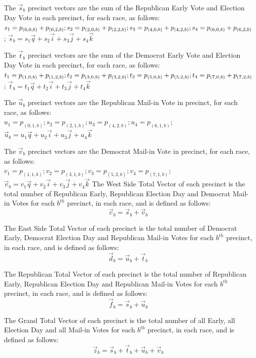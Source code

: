 The $\vec{s}_b$ precinct vectors are the sum of the Republican Early Vote and Election Day Vote in each precinct, for each race, as follows:\\
$s_{1}=p_{(0,0,b)}+p_{(0,2,b)}; s_{2}=p_{(2,0,b)}+p_{(2,2,b)};\\
s_{3}=p_{(4,0,b)}+p_{(4,2,b)}; s_{4}=p_{(6,0,b)}+p_{(6,2,b)}$; $\vec{s}_{b}=s_{1}\vec{q}+s_{2}\vec{i}+s_{3}\vec{j}+s_{4}\vec{k}$

The $\vec{t}_b$ precinct vectors are the sum of the Democrat Early Vote and Election Day Vote in each precinct, for each race, as follows:\\
$t_{1}=p_{(1,0,b)}+p_{(1,2,b)}; t_{2}=p_{(3,0,b)}+p_{(3,2,b)};\\
t_{3}=p_{(5,0,b)}+p_{(5,2,b)}; t_{4}=p_{(7,0,b)}+p_{(7,2,b)}$; $\vec{t}_{b}=t_{1}\vec{q}+t_{2}\vec{i}+t_{3}\vec{j}+t_{4}\vec{k}$

The $\vec{u}_b$ precinct vectors are the Republican Mail-in Vote in precinct, for each race, as follows:\\
$u_{1}=p_{(0,1,b)}; s_{2}=p_{(2,1,b)}; u_{3}=p_{(4,2,b)}; u_{4}=p_{(6,1,b)}$; $\vec{u}_{b}=u_{1}\vec{q}+u_{2}\vec{i}+u_{3}\vec{j}+u_{4}\vec{k}$

The $\vec{v}_b$ precinct vectors are the Democrat Mail-in Vote in precinct, for each race, as follows:\\
$v_{1}=p_{(1,1,b)}; v_{2}=p_{(3,1,b)}; v_{3}=p_{(5,2,b)}; v_{4}=p_{(7,1,b)}$; $\vec{v}_{b}=v_{1}\vec{q}+v_{2}\vec{i}+v_{3}\vec{j}+v_{4}\vec{k}$
\newpage
The West Side Total Vector of each precinct is the total number of Republican Early, Republican Election Day and Democrat Mail-in Votes for each $b^{th}$ precinct, in each race, and is defined as follows:
$$\vec{c}_{b}=\vec{s}_{b}+\vec{v}_{b}$$

The East Side Total Vector of each precinct is the total number of Democrat Early, Democrat Election Day and Republican Mail-in Votes for each $b^{th}$ precinct, in each race, and is defined as follows:
$$\vec{d}_{b}=\vec{u}_{b}+\vec{t}_{b}$$

The Republican Total Vector of each precinct is the total number of Republican Early, Republican Election Day and Republican Mail-in Votes for each $b^{th}$ precinct, in each race, and is defined as follows:
$$\vec{f}_{b}=\vec{s}_{b}+\vec{u}_{b}$$

The Grand Total Vector of each precinct is the total number of all Early, all Election Day and all Mail-in Votes for each $b^{th}$ precinct, in each race, and is defined as follows:
$$\vec{z}_{b}=\vec{s}_{b}+\vec{t}_{b}+\vec{u}_{b}+\vec{v}_{b}$$

